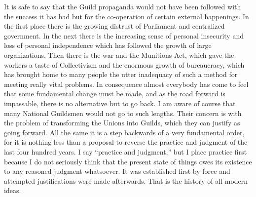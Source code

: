 \documentclass{book}
\begin{document}
It is safe to say that the Guild propaganda would not have been followed with the success it has had but for the co-operation of certain external happenings. In the first place there is the growing distrust of Parliament and centralized government. In the next there is the increasing sense of personal insecurity and loss of personal independence which has followed the growth of large organizations. Then there is the war and the Munitions Act, which gave the workers a taste of Collectivism and the enormous growth of bureaucracy, which has brought home to many people the utter inadequacy of such a method for meeting really vital problems. In consequence almost everybody has come to feel that some fundamental change must be made, and as the road forward is impassable, there is no alternative but to go back. I am aware of course that many National Guildsmen would not go to such lengths. Their concern is with the problem of transforming the Unions into Guilds, which they can justify as going forward. All the same it is a step backwards of a very fundamental order, for it is nothing less than a proposal to reverse the practice and judgment of the last four hundred years. I say “practice and judgment,” but I place practice first because I do not seriously think that the present state of things owes its existence to any reasoned judgment whatsoever. It was established first by force and attempted justifications were made afterwards. That is the history of all modern ideas.
\end{document}
